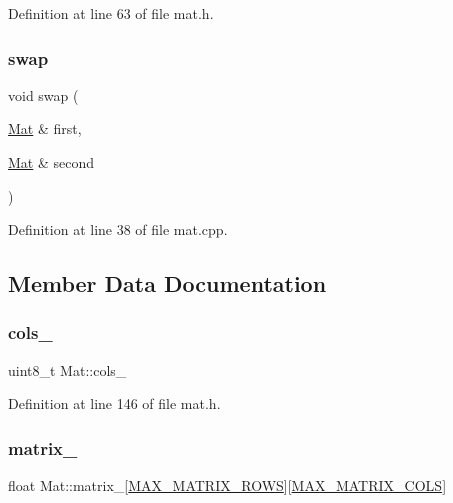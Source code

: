 Definition at line 63 of file mat.\+h.

\mbox{\label{class_mat_a67468cb8d132dc0a2d02af527103d82e}} 
\subsubsection{\texorpdfstring{swap}{swap}}
{\footnotesize\ttfamily void swap (\begin{DoxyParamCaption}\item[{\mbox{\hyperlink{class_mat}{Mat}} \&}]{first,  }\item[{\mbox{\hyperlink{class_mat}{Mat}} \&}]{second }\end{DoxyParamCaption})\hspace{0.3cm}{\ttfamily [friend]}}



Definition at line 38 of file mat.\+cpp.



\subsection{Member Data Documentation}
\mbox{\label{class_mat_af7abe041c4852f35dd45c4c65523b130}} 
\subsubsection{\texorpdfstring{cols\_}{cols\_}}
{\footnotesize\ttfamily uint8\+\_\+t Mat\+::cols\+\_\+\hspace{0.3cm}{\ttfamily [private]}}



Definition at line 146 of file mat.\+h.

\mbox{\label{class_mat_a7753c4dcb04086512d8049d0207e9815}} 
\subsubsection{\texorpdfstring{matrix\_}{matrix\_}}
{\footnotesize\ttfamily float Mat\+::matrix\+\_\+\mbox{[}\mbox{\hyperlink{mat_8h_a1513f6941a3ccf82f3c3848e91860285}{M\+A\+X\+\_\+\+M\+A\+T\+R\+I\+X\+\_\+\+R\+O\+WS}}\mbox{]}\mbox{[}\mbox{\hyperlink{mat_8h_a6df08808870b848d8ab21bf57288c748}{M\+A\+X\+\_\+\+M\+A\+T\+R\+I\+X\+\_\+\+C\+O\+LS}}\mbox{]}\hspace{0.3cm}{\ttfamily [private]}}



